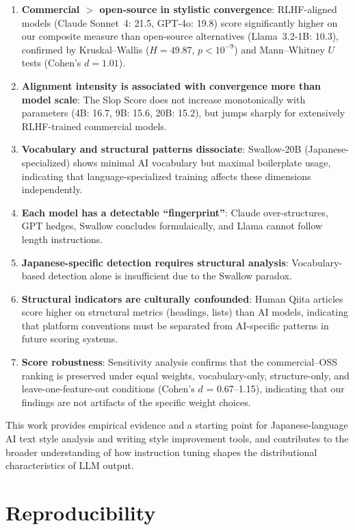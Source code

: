 \documentclass[11pt,a4paper]{article}
\begin{document}
\begin{enumerate}
    \item \textbf{Commercial $>$ open-source in stylistic convergence}: RLHF-aligned models (Claude Sonnet~4: 21.5, GPT-4o: 19.8) score significantly higher on our composite measure than open-source alternatives (Llama~3.2-1B: 10.3), confirmed by Kruskal--Wallis ($H = 49.87$, $p < 10^{-9}$) and Mann--Whitney $U$ tests (Cohen's $d = 1.01$).
    \item \textbf{Alignment intensity is associated with convergence more than model scale}: The Slop Score does not increase monotonically with parameters (4B: 16.7, 9B: 15.6, 20B: 15.2), but jumps sharply for extensively RLHF-trained commercial models.
    \item \textbf{Vocabulary and structural patterns dissociate}: Swallow-20B (Japanese-specialized) shows minimal AI vocabulary but maximal boilerplate usage, indicating that language-specialized training affects these dimensions independently.
    \item \textbf{Each model has a detectable ``fingerprint''}: Claude over-structures, GPT hedges, Swallow concludes formulaically, and Llama cannot follow length instructions.
    \item \textbf{Japanese-specific detection requires structural analysis}: Vocabulary-based detection alone is insufficient due to the Swallow paradox.
    \item \textbf{Structural indicators are culturally confounded}: Human Qiita articles score higher on structural metrics (headings, lists) than AI models, indicating that platform conventions must be separated from AI-specific patterns in future scoring systems.
    \item \textbf{Score robustness}: Sensitivity analysis confirms that the commercial--OSS ranking is preserved under equal weights, vocabulary-only, structure-only, and leave-one-feature-out conditions (Cohen's $d$ = 0.67--1.15), indicating that our findings are not artifacts of the specific weight choices.
\end{enumerate}

This work provides empirical evidence and a starting point for Japanese-language AI text style analysis and writing style improvement tools, and contributes to the broader understanding of how instruction tuning shapes the distributional characteristics of LLM output.

\section*{Reproducibility}
\end{document}
